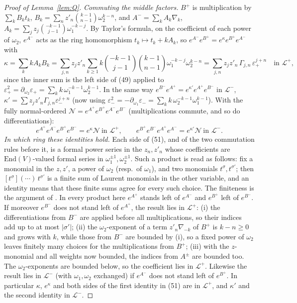 \documentclass[11pt]{amsart}
\theoremstyle{remark}
\newcommand{\cL}{\mathcal{L}}
\begin{document}
\begin{proof}[Proof of Lemma~\ref{lem:Q}]
\emph{Commuting the middle factors.} $B^+$ is multiplication by $\sum_kB_kt_k$, $B_k=\sum_nz'_n\binom{k-1}{n-1}\omega_2^{k-n}$,
and $A^-=\sum_kA_k\nabla_k$, $A_k=\sum_jz_j\binom{-k-1}{j-1}\omega_1^{-k-j}$. By Taylor's formula, on the coefficient of each power of $\omega_2$,
$e^{A^-}$ acts as the ring homomorphism $t_k\mapsto t_k+kA_k$, so
$e^{A^-}e^{B^+}=e^{\kappa}e^{B^+}e^{A^-}$ with
\[
\kappa=\sum_kkA_kB_k=\sum_{j,n}z_jz'_n\sum_{k\ge1}k\binom{-k-1}{j-1}\binom{k-1}{n-1}\omega_1^{-k-j}\omega_2^{k-n}
=\sum_{j,n}z_jz'_n\,\Gamma_{j,n}\,\varepsilon_+^{j+n}\quad\text{in }\cL^+,
\]
since the inner sum is the left side of (49) applied to $\varepsilon_+^2=\partial_{\omega_2}\varepsilon_+=\sum_kk\,\omega_1^{-k-1}\omega_2^{k-1}$.
In the same way $e^{B^-}e^{A^+}=e^{\kappa'}e^{A^+}e^{B^-}$ in $\cL^-$, $\kappa'=\sum z_jz'_n\Gamma_{j,n}\varepsilon_-^{j+n}$
(now using $\varepsilon_-^2=-\partial_{\omega_1}\varepsilon_-=\sum_kk\,\omega_2^{-k-1}\omega_1^{k-1}$). With the fully
normal-ordered $\mathcal N=e^{A^+}e^{B^+}e^{A^-}e^{B^-}$ (multiplications commute, and so do differentiations):
\begin{equation}\tag{51}
e^{A^+}e^{A^-}e^{B^+}e^{B^-}=e^{\kappa}\mathcal N\ \text{in }\cL^+,\qquad e^{B^+}e^{B^-}e^{A^+}e^{A^-}=e^{\kappa'}\mathcal N\ \text{in }\cL^-.
\end{equation}
\emph{In which ring these identities hold.} Each side of (51), and of the two commutation rules before it, is a
formal power series in the $z_n,z'_n$ whose coefficients are $\mathrm{End}(V)$-valued formal series in
$\omega_1^{\pm1},\omega_2^{\pm1}$. Such a product is read as follows: fix a monomial in the $z,z'$, a power of
$\omega_2$ (resp.\ of $\omega_1$), and two monomials $t^\sigma,t^{\sigma'}$; then $[t^\sigma](\cdots)\,t^{\sigma'}$ is a
finite sum of Laurent monomials in the other variable, and an identity means that these finite sums agree for every
such choice. The finiteness is the argument of \cite[App.~B]{ETH}. In every product here $e^{A^+}$ stands left of
$e^{A^-}$ and $e^{B^+}$ left of $e^{B^-}$. If moreover $e^{B^-}$ does not stand left of $e^{A^+}$, the result lies in
$\cL^+$: (i) the differentiations from $B^-$ are applied before all multiplications, so their indices add up to at most
$|\sigma'|$; (ii) the $\omega_2$-exponent of a term $z'_n\nabla_{-k}$ of $B^+$ is $k-n\ge0$ and grows with $k$, while
those from $B^-$ are bounded by (i), so a fixed power of $\omega_2$ leaves finitely many choices for the
multiplications from $B^+$; (iii) with the $z$-monomial and all weights now bounded, the indices from $A^\pm$ are
bounded too. The $\omega_2$-exponents are bounded below, so the coefficient lies in $\cL^+$. Likewise the result lies
in $\cL^-$ (with $\omega_1,\omega_2$ exchanged) if $e^{A^-}$ does not stand left of $e^{B^+}$. In particular
$\kappa$, $e^\kappa$ and both sides of the first identity in (51) are in $\cL^+$, and $\kappa'$ and the second identity
in $\cL^-$.


\end{proof}
\end{document}
